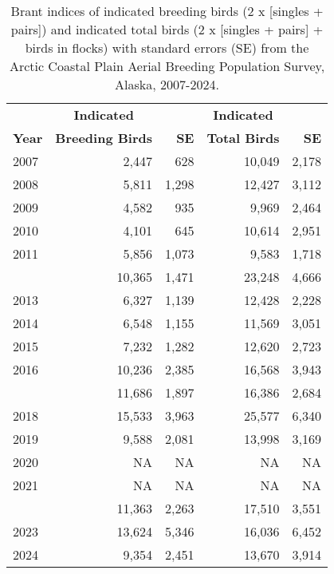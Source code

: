 \documentclass[
]{article}
\begin{document}
\begingroup\fontsize{10}{12}\selectfont

\begin{longtable}[t]{lrrrr}

\caption{\label{tbl-BRAN}Brant indices of indicated breeding birds (2 x
{[}singles + pairs{]}) and indicated total birds (2 x {[}singles +
pairs{]} + birds in flocks) with standard errors (SE) from the Arctic
Coastal Plain Aerial Breeding Population Survey, Alaska, 2007-2024.}

\tabularnewline

\\
\toprule
\multicolumn{1}{c}{\textbf{ }} & \multicolumn{1}{c}{\textbf{Indicated}} & \multicolumn{1}{c}{\textbf{ }} & \multicolumn{1}{c}{\textbf{Indicated}} & \multicolumn{1}{c}{\textbf{ }} \\
\cmidrule(l{3pt}r{3pt}){2-2} \cmidrule(l{3pt}r{3pt}){4-4}
\textbf{Year} & \textbf{Breeding Birds} & \textbf{SE} & \textbf{Total Birds} & \textbf{SE}\\
\midrule
2007 & 2,447 & 628 & 10,049 & 2,178\\
2008 & 5,811 & 1,298 & 12,427 & 3,112\\
2009 & 4,582 & 935 & 9,969 & 2,464\\
2010 & 4,101 & 645 & 10,614 & 2,951\\
2011 & 5,856 & 1,073 & 9,583 & 1,718\\
\addlinespace
2012 & 10,365 & 1,471 & 23,248 & 4,666\\
2013 & 6,327 & 1,139 & 12,428 & 2,228\\
2014 & 6,548 & 1,155 & 11,569 & 3,051\\
2015 & 7,232 & 1,282 & 12,620 & 2,723\\
2016 & 10,236 & 2,385 & 16,568 & 3,943\\
\addlinespace
2017 & 11,686 & 1,897 & 16,386 & 2,684\\
2018 & 15,533 & 3,963 & 25,577 & 6,340\\
2019 & 9,588 & 2,081 & 13,998 & 3,169\\
2020 & NA & NA & NA & NA\\
2021 & NA & NA & NA & NA\\
\addlinespace
2022 & 11,363 & 2,263 & 17,510 & 3,551\\
2023 & 13,624 & 5,346 & 16,036 & 6,452\\
2024 & 9,354 & 2,451 & 13,670 & 3,914\\
\bottomrule

\end{longtable}
\end{document}
